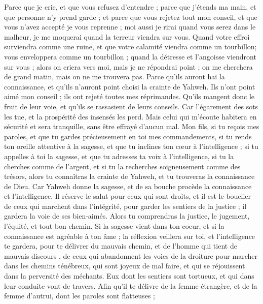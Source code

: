 \begin{multicols}{2}
Parce que je crie, et que vous refusez d'entendre ; parce que j'étends ma main, et que personne n'y prend garde ;
et parce que vous rejetez tout mon conseil, et que vous n'avez accepté je vous reprenne ;
moi aussi je rirai quand vous serez dans le malheur, je me moquerai quand la terreur viendra sur vous.
Quand votre effroi surviendra comme une ruine, et que votre calamité viendra comme un tourbillon; vous enveloppera comme un tourbillon ; quand la détresse et l'angoisse viendront  sur vous ;
alors on criera vers moi, mais je ne répondrai point ; on me cherchera de grand matin, mais on ne me trouvera pas.
Parce qu'ils auront haï la connaissance, et qu'ils n'auront point choisi la crainte de Yahweh.
Ils n'ont point aimé mon conseil ; ils ont rejeté toutes mes réprimandes.
Qu'ils mangent donc le fruit de leur voie, et qu'ils se rassasient de leurs conseils.
Car l'égarement des sots les tue, et la prospérité des insensés les perd.
Mais celui qui m'écoute habitera en sécurité et sera tranquille, sans être effrayé d'aucun mal.
\VerseOne{}Mon fils, si tu reçois mes paroles, et que tu gardes précieusement en toi mes commandements,
si tu rends ton oreille attentive à la sagesse, et que tu inclines ton cœur à l'intelligence ;
si tu appelles à toi la sagesse, et que tu adresses ta voix à l'intelligence,
si tu la cherches comme de l'argent, et si tu la recherches soigneusement comme des trésors,
alors tu connaîtras la crainte de Yahweh, et tu trouveras la connaissance de Dieu.
Car Yahweh donne la sagesse, et de sa bouche procède la connaissance et l'intelligence.
Il réserve le salut pour ceux qui sont droits, et il est le bouclier de ceux qui marchent dans l'intégrité,
pour garder les sentiers de la justice ; il gardera la voie de ses bien-aimés.
Alors tu comprendras la justice, le jugement, l'équité, et tout bon chemin.
Si la sagesse vient dans ton coeur, et si la connaissance est agréable à ton âme ;
la réflexion veillera sur toi, et l'intelligence te gardera,
pour te délivrer du mauvais chemin, et de l'homme qui tient de mauvais discours ,
de ceux qui abandonnent les voies de la droiture pour marcher dans les chemins ténébreux,
qui sont joyeux de mal faire, et qui se réjouissent dans la perversité des méchants.
Eux dont les sentiers sont tortueux, et qui dans leur conduite vont de travers.
Afin qu'il te délivre de la femme étrangère, et de la femme d'autrui, dont les paroles sont flatteuses ;

\end{multicols}
